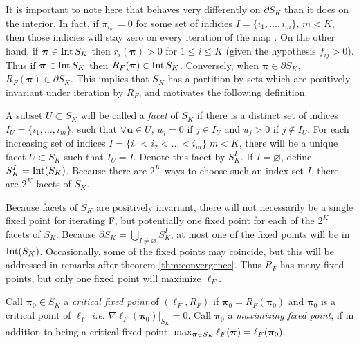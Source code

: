 \begin{rk}\label{boundary}%
	
	It is important to note here that  behaves very differently on \( \partial S_K \) than it does on the interior. In fact, if $\pi_{i_m}=0$ for some set of indicies $I=\{i_1,\ldots,i_m\},\, m<K$, then those indicies will stay zero on every iteration of the map . On the other hand, if \( \bm\pi\in\operatorname{Int}S_K \) then \( r_i(\bm\pi)>0 \) for \( 1\leq i\leq K \) (given the hypothesis \( f_{ij}>0 \)). Thus if \( \bm\pi\in\operatorname{Int}S_K \) then \( R_F(\bm\pi)\in\operatorname{Int}S_K \). Conversely, when \( \bm\pi\in\partial S_K \), \( R_F(\bm\pi)\in\partial S_K \). This implies that \( S_K \) has a partition by sets which are positively invariant under iteration by \( R_F \), and motivates the following definition.
	
	\begin{defn}[Facet]
		A subset \( U\subset S_K \) will be called a \textit{facet} of \( S_K \) if there is a distinct set of indices \( I_U = \{i_1,\ldots,i_m\} \), such that \(\forall \bm u\in U \), \( u_j=0  \) if \( j\in I_U \) and \( u_j >0 \) if \( j\notin I_U \).  For each increasing set of indices \( I=\{i_1<i_2<\ldots<i_m\}\; m<K \), there will be a unique facet \( U\subset S_K \) such that \( I_U=I \). Denote this facet by \( S_K^I. \)  If \( I=\varnothing \), define \( S_K^{I} = \operatorname{Int}(S_K) \). Because there are \( 2^K \) ways to choose such an index set \( I \), there are \( 2^K \) facets of \( S_K \).
	\end{defn}
	
	Because facets of \( S_K \) are positively invariant, there will not necessarily be a single fixed point for iterating \Rpi F, but potentially one fixed point for each of the \( 2^K \) %
	facets of \( S_K \).  Because \( \partial S_K = \bigcup_{I\neq\varnothing} S_K^I\), at most one of the fixed points will be in \( \operatorname{Int}(S_K) \). Occasionally, some of the fixed points may coincide, but this will be addressed in remarks after theorem \ref{thm:convergence}. Thus \( R_F \) has many fixed points, but only one fixed point will maximize \( \ell_{F} \).  
	\begin{defn}
		Call \( \bm\pi_0\in S_K \) a \textit{critical fixed point} of \( (\ell_F,R_F) \) if \( \bm\pi_0=R_F(\bm\pi_0) \) and \( \bm\pi_0 \) is a critical point of \( \ell_F \) \textit{i.e.} \( \left.\nabla \ell_{F}(\bm\pi_0)\right|_{S_K} = 0\). Call \( \bm\pi_0 \) a \textit{maximizing fixed point}, if in addition to being a critical fixed point, \( \max_{\bm\pi\in S_K}\ell_{F}({\bm\pi}) = \ell_{F}(\bm\pi_0). \)  
	\end{defn}
	

\end{rk}
